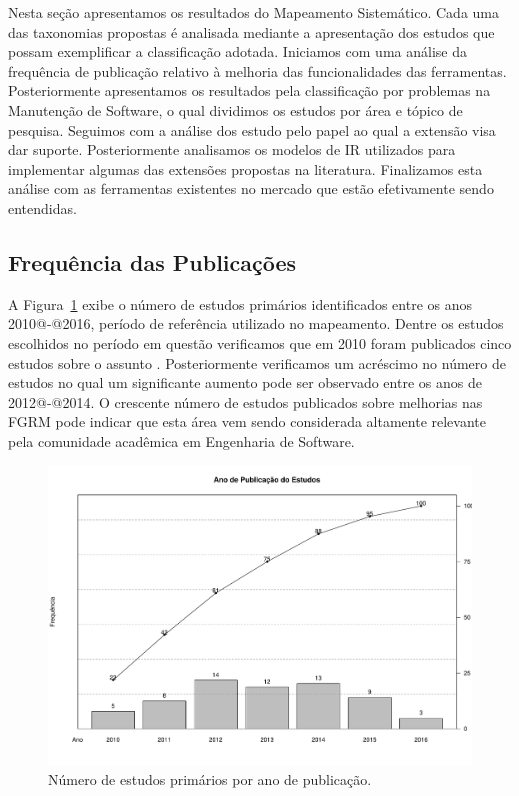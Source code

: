 Nesta seção apresentamos os resultados do Mapeamento Sistemático. Cada uma das
taxonomias propostas é analisada mediante a apresentação dos estudos que possam
exemplificar a classificação adotada.  Iniciamos com uma análise da frequência
de publicação relativo à melhoria das funcionalidades das ferramentas.
Posteriormente apresentamos os resultados pela classificação por problemas na
Manutenção de Software, o qual dividimos os estudos por área e tópico de
pesquisa. Seguimos com a análise dos estudo pelo papel ao qual a extensão visa
dar suporte. Posteriormente analisamos os modelos de IR utilizados para
implementar algumas das extensões propostas na literatura. Finalizamos esta
análise com as ferramentas existentes no mercado que estão efetivamente sendo
entendidas.

\subsection{Frequência das Publicações} \label{sub:frequencia_publicacao}

A Figura~\ref{fig:publicacao_por_ano} exibe o número de estudos primários
identificados entre os anos 2010@-@2016, período de referência utilizado no
mapeamento. Dentre os estudos escolhidos no período em questão verificamos que
em 2010 foram publicados cinco estudos sobre o assunto
\cite{sun2010discriminative,gegick2010identifying,song2010jdf,nagwani2010predictive,zimmermann2010makes}.
Posteriormente verificamos um acréscimo no número de estudos no qual um
significante aumento pode ser observado entre os anos de 2012@-@2014. O
crescente número de estudos publicados sobre melhorias nas FGRM pode indicar que
esta área vem sendo considerada altamente relevante pela comunidade acadêmica em
Engenharia de Software.

\begin{figure}[htpb] \centering
	\includegraphics[width=0.9\linewidth]{chapter-mapeamento-sistematico/img/ano-publicao-estudos.pdf}
	\caption{Número de estudos primários por ano de publicação.}
	\label{fig:publicacao_por_ano} \end{figure}


